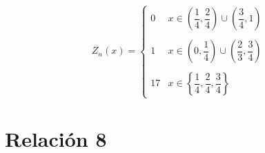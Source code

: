 \documentclass[openany]{book}
\begin{document}
\begin{exercise}
    $$ Z_n(x) = \left\{
    \begin{array}{ll}
        0 & x \in \left(\dfrac{1}{4},\dfrac{2}{4}\right) \cup \left(\dfrac{3}{4},1\right)\\ \\ 
        1 & x \in \left(0,\dfrac{1}{4}\right) \cup \left(\dfrac{2}{3},\dfrac{3}{4}\right)\\ \\ 
        17 & x \in \left\{\dfrac{1}{4},\dfrac{2}{4},\dfrac{3}{4}\right\}
    \end{array}
    \right. $$

\end{exercise}


\chapter{Relación 8}
\end{document}
